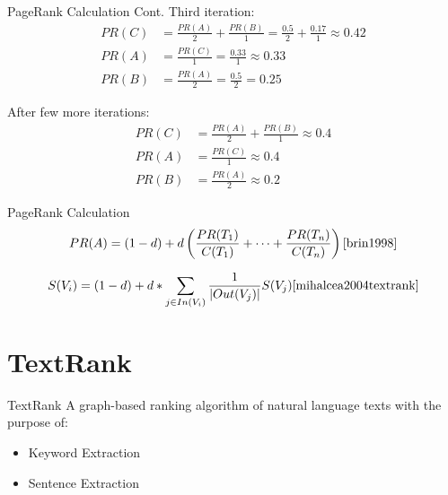 \documentclass[10pt]{beamer}
\begin{document}
{
\begin{frame}{PageRank Calculation Cont.}\label{pg:calculation}
Third iteration:
 	\begin{align*}
    		PR(C) &=\frac{PR(A)}{2}  + \frac{PR(B)}{1}  = \frac{0.5}{2} + \frac{0.17}{1} \approx 0.42\\
            PR(A) &=\frac{PR(C)}{1}  = \frac{0.33}{1} \approx 0.33\\
            PR(B) &=\frac{PR(A)}{2}  = \frac{0.5}{2} = 0.25
	\end{align*}
  
After few more iterations:
 	\begin{align*}
    		PR(C) &=\frac{PR(A)}{2}  + \frac{PR(B)}{1}  \approx 0.4\\
            PR(A) &=\frac{PR(C)}{1}  \approx 0.4\\
            PR(B) &=\frac{PR(A)}{2}  \approx 0.2
	\end{align*}
\end{frame}
}
\begin{frame}{PageRank Calculation}
  \begin{equation*}
	PR(A) = (1-d) + d \left(\frac{PR(T_1)}{C(T_1)} + \cdots + \frac{PR(T_n)}{C(T_n)}\right) \cite{brin1998}
  \end{equation*}
  
  \begin{equation*}
    S(V_i) = (1 - d) + d * \sum_{j\in In(V_i)} \frac{1}{\lvert Out(V_j)\rvert}S(V_j)\cite{mihalcea2004textrank}
  \end{equation*}
\end{frame}

\section{TextRank}
\begin{frame}{TextRank}
A graph-based ranking algorithm of natural language texts with the purpose of:
  \begin{itemize}[<+- | alert@+>]
    \item Keyword Extraction
    \item Sentence Extraction
  \end{itemize}
\end{frame}
\end{document}
